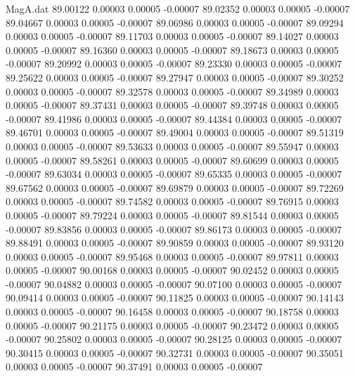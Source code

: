 \begin{filecontents}{MagA.dat}
  89.00122    0.00003    0.00005   -0.00007
  89.02352    0.00003    0.00005   -0.00007
  89.04667    0.00003    0.00005   -0.00007
  89.06986    0.00003    0.00005   -0.00007
  89.09294    0.00003    0.00005   -0.00007
  89.11703    0.00003    0.00005   -0.00007
  89.14027    0.00003    0.00005   -0.00007
  89.16360    0.00003    0.00005   -0.00007
  89.18673    0.00003    0.00005   -0.00007
  89.20992    0.00003    0.00005   -0.00007
  89.23330    0.00003    0.00005   -0.00007
  89.25622    0.00003    0.00005   -0.00007
  89.27947    0.00003    0.00005   -0.00007
  89.30252    0.00003    0.00005   -0.00007
  89.32578    0.00003    0.00005   -0.00007
  89.34989    0.00003    0.00005   -0.00007
  89.37431    0.00003    0.00005   -0.00007
  89.39748    0.00003    0.00005   -0.00007
  89.41986    0.00003    0.00005   -0.00007
  89.44384    0.00003    0.00005   -0.00007
  89.46701    0.00003    0.00005   -0.00007
  89.49004    0.00003    0.00005   -0.00007
  89.51319    0.00003    0.00005   -0.00007
  89.53633    0.00003    0.00005   -0.00007
  89.55947    0.00003    0.00005   -0.00007
  89.58261    0.00003    0.00005   -0.00007
  89.60699    0.00003    0.00005   -0.00007
  89.63034    0.00003    0.00005   -0.00007
  89.65335    0.00003    0.00005   -0.00007
  89.67562    0.00003    0.00005   -0.00007
  89.69879    0.00003    0.00005   -0.00007
  89.72269    0.00003    0.00005   -0.00007
  89.74582    0.00003    0.00005   -0.00007
  89.76915    0.00003    0.00005   -0.00007
  89.79224    0.00003    0.00005   -0.00007
  89.81544    0.00003    0.00005   -0.00007
  89.83856    0.00003    0.00005   -0.00007
  89.86173    0.00003    0.00005   -0.00007
  89.88491    0.00003    0.00005   -0.00007
  89.90859    0.00003    0.00005   -0.00007
  89.93120    0.00003    0.00005   -0.00007
  89.95468    0.00003    0.00005   -0.00007
  89.97811    0.00003    0.00005   -0.00007
  90.00168    0.00003    0.00005   -0.00007
  90.02452    0.00003    0.00005   -0.00007
  90.04882    0.00003    0.00005   -0.00007
  90.07100    0.00003    0.00005   -0.00007
  90.09414    0.00003    0.00005   -0.00007
  90.11825    0.00003    0.00005   -0.00007
  90.14143    0.00003    0.00005   -0.00007
  90.16458    0.00003    0.00005   -0.00007
  90.18758    0.00003    0.00005   -0.00007
  90.21175    0.00003    0.00005   -0.00007
  90.23472    0.00003    0.00005   -0.00007
  90.25802    0.00003    0.00005   -0.00007
  90.28125    0.00003    0.00005   -0.00007
  90.30415    0.00003    0.00005   -0.00007
  90.32731    0.00003    0.00005   -0.00007
  90.35051    0.00003    0.00005   -0.00007
  90.37491    0.00003    0.00005   -0.00007

\end{filecontents}
